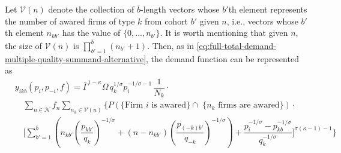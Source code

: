 \documentclass[12pt]{article}
\begin{document}
Let $\mathcal{V} (n)$ denote the collection of $\bar b$-length vectors whose $b'$th element represents the number of awared firms of type $k$ from cohort $b'$ given $n$, i.e., vectors whose $b'$th element $n_{kb'}$ has the value of $\{0,..., n_{b'} \}$. It is worth mentioning that given $n$, the size of $\mathcal{V} (n)$ is $\prod_{b'=1}^{\bar b} (n_{b'} + 1)$. Then, as in \eqref{eq:full-total-demand-multiple-quality-summand-alternative}, the demand function can be represented as
\begin{equation}\label{eq:full-total-demand-two-quality-multiple-cohort}
\begin{aligned}
& y_{ikb}(p_i, p_{-i}, f) 
=  \bar{\Gamma}^{1-\kappa}\Omega \, q_k^{1/\sigma}p_i^{-1/\sigma - 1}\, \dfrac{1}{N_k} \cdot  \\ 
& \quad \sum_{n \in \mathcal{N} } f_n   \sum_{n_k \in \mathcal{V} (n) }  
\Bigg\{
P( \text{\{Firm $i$ is awared\} $\cap$ \{$n_k$ firms are awared\}})
\cdot \\ & \quad
\Bigg[
\sum_{b' = 1}^{\bar b} 
\left(
n_{kb'} \left( \dfrac{p_{kb'}}{q_{k}}   \right)^{-1/\sigma} +  
(n - n_{kb'}) \left( \dfrac{p_{(-k)b'}}{q_{-k}}   \right)^{-1/\sigma} \right) + 
\dfrac{p_i^{-1/\sigma} - p^{-1/\sigma}_{kb} }{ q_k^{-1/\sigma }} 
\Bigg]^{\sigma (\kappa - 1)-1} \Bigg\}
\end{aligned}
\end{equation}
\end{document}
